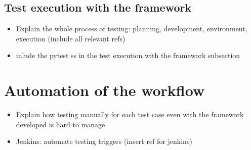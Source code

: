 \subsection{Test execution with the framework}
\begin{itemize}
    \item Explain the whole process of testing: planning, development, environment, execution (include all relevant refs)
    \item inlude the pytest ss in the test execution with the framework subsection
\end{itemize}

\section{Automation of the workflow}
\begin{itemize}
    \item Explain how testing manually for each test case even with the framework developed is hard to manage
    \item Jenkins: automate testing triggers (insert ref for jenkins)
\end{itemize}